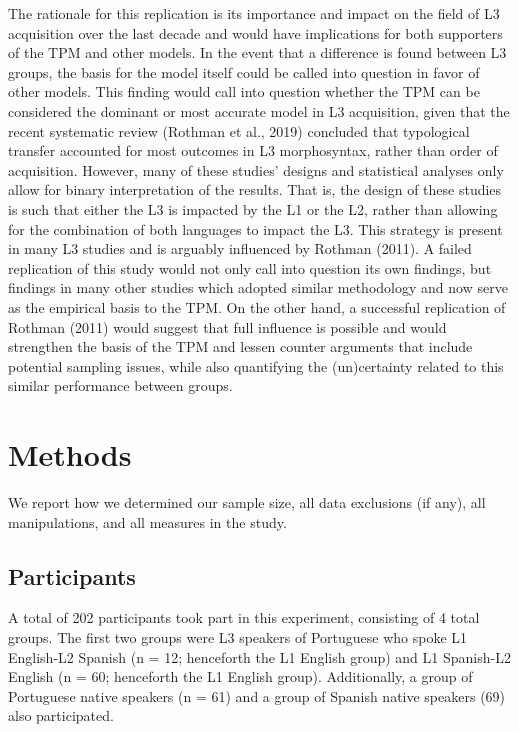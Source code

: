 \documentclass[
  man]{apa6}
\begin{document}
The rationale for this replication is its importance and impact on the field of L3 acquisition over the last decade and would have implications for both supporters of the TPM and other models.
In the event that a difference is found between L3 groups, the basis for the model itself could be called into question in favor of other models.
This finding would call into question whether the TPM can be considered the dominant or most accurate model in L3 acquisition, given that the recent systematic review (Rothman et al., 2019) concluded that typological transfer accounted for most outcomes in L3 morphosyntax, rather than order of acquisition.
However, many of these studies' designs and statistical analyses only allow for binary interpretation of the results.
That is, the design of these studies is such that either the L3 is impacted by the L1 or the L2, rather than allowing for the combination of both languages to impact the L3.
This strategy is present in many L3 studies and is arguably influenced by Rothman (2011).
A failed replication of this study would not only call into question its own findings, but findings in many other studies which adopted similar methodology and now serve as the empirical basis to the TPM.
On the other hand, a successful replication of Rothman (2011) would suggest that full influence is possible and would strengthen the basis of the TPM and lessen counter arguments that include potential sampling issues, while also quantifying the (un)certainty related to this similar performance between groups.

\hypertarget{methods}{%
\section{Methods}\label{methods}}

We report how we determined our sample size, all data exclusions (if any), all manipulations, and all measures in the study.

\hypertarget{participants}{%
\subsection{Participants}\label{participants}}

A total of 202 participants took part in this experiment, consisting of 4 total groups.
The first two groups were L3 speakers of Portuguese who spoke L1 English-L2 Spanish (n = 12; henceforth the L1 English group) and L1 Spanish-L2 English (n = 60; henceforth the L1 English group).
Additionally, a group of Portuguese native speakers (n = 61) and a group of Spanish native speakers (69) also participated.
\end{document}
